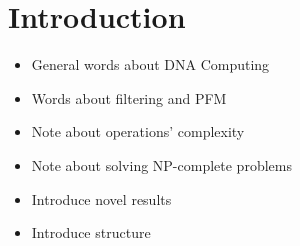 \section{Introduction}
\begin{itemize}
	\item General words about DNA Computing \cite{Amos:2002, Adleman:1994,  Lipton:1994, Rozenberg:knapsack, Paun:???}
	\item Words about filtering and PFM \cite{Amos:1996}
	\item Note about operations' complexity \cite{Amos:1997}
	\item Note about solving NP-complete problems
	\item Introduce novel results
	\item Introduce structure
\end{itemize}


